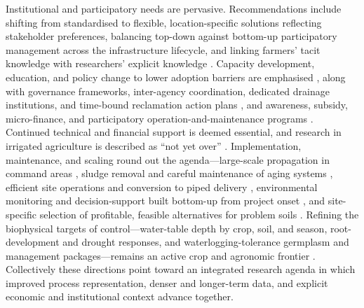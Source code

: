 \documentclass[11pt]{article}
\begin{document}
Institutional and participatory needs are pervasive. Recommendations include
shifting from standardised to flexible, location-specific solutions reflecting
stakeholder preferences, balancing top-down against bottom-up participatory
management across the infrastructure lifecycle, and linking farmers' tacit
knowledge with researchers' explicit knowledge
\parencite{Ritzema2011,Ritzema2016,Ritzema2023}. Capacity development, education,
and policy change to lower adoption barriers are emphasised
\parencite{Ritzema2016,Castellano2019,SHIRMOHAMMADI1995,Kesicka2023b}, along with
governance frameworks, inter-agency coordination, dedicated drainage institutions,
and time-bound reclamation action plans
\parencite{Singh2019c,Qureshi2008,Gopalakrishnan2007,Ritzema2008b,Valipour2014,Quinn2009},
and awareness, subsidy, micro-finance, and participatory operation-and-maintenance
programs \parencite{Satyanarayana2007,Manjunatha2004,BenAissa2013,MCFARLANE1992}.
Continued technical and financial support is deemed essential, and research in
irrigated agriculture is described as ``not yet over''
\parencite{Qureshi2008,Ritzema2007,TeKrony2004}. Implementation, maintenance, and
scaling round out the agenda---large-scale propagation in command areas
\parencite{Karegoudar2019}, sludge removal and careful maintenance of aging
systems \parencite{Yan2013b,AbdElMageed2009,Lamsodis2011}, efficient site
operations and conversion to piped delivery \parencite{Kanber2019}, environmental
monitoring and decision-support built bottom-up from project onset
\parencite{Quinn2009,Gopalakrishnan2007}, and site-specific selection of
profitable, feasible alternatives for problem soils
\parencite{MOSTAGHIMI1989,Sharma1998,Muirhead1996,Guedessou2021,Imran2021,DarziNaftchali2017,HARRIS1993,CAMP1982}.
Refining the biophysical targets of control---water-table depth by crop, soil, and
season, root-development and drought responses, and waterlogging-tolerance
germplasm and management packages---remains an active crop and agronomic frontier
\parencite{Christen2001b,Nash2015b,Chen2021,Manik2019,Qureshi2008,Sarwar2001,Ritzema2008b,Khorramian2022,Gul2013,Steppuhn2017}.
Collectively these directions point toward an integrated research agenda in which
improved process representation, denser and longer-term data, and explicit economic
and institutional context advance together.

\printbibliography
\end{document}
